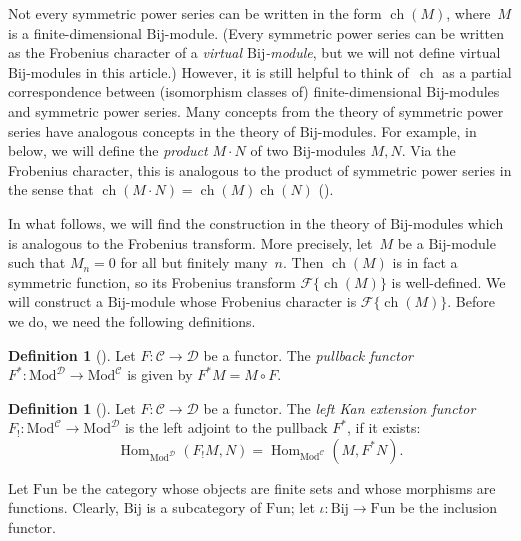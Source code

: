 \documentclass[11pt]{article}
\theoremstyle{definition}
\newtheorem{defi}[theo]{Definition}
\numberwithin{equation}{section}
\newcommand{\Mod}{\mathrm{Mod}}
\newcommand{\rmBij}{\mathrm{Bij}}
\newcommand{\rmFun}{\mathrm{Fun}}
\newcommand{\F}[1]{\mathscr{F}\{#1\}}
\DeclareMathOperator{\ch}{ch}
\DeclareMathOperator{\Hom}{Hom}
\begin{document}
Not every symmetric power series can be written in the form $\ch(M)$, where~$M$ is a finite-dimensional $\rmBij$-module. (Every symmetric power series can be written as the Frobenius character of a \emph{virtual $\rmBij$-module}, but we will not define virtual $\rmBij$-modules in this article.) However, it is still helpful to think of~$\ch$ as a partial correspondence between (isomorphism classes of) finite-dimensional $\rmBij$-modules and symmetric power series. Many concepts from the theory of symmetric power series have analogous concepts in the theory of $\rmBij$-modules. For example, in  below, we will define the \emph{product} $M \cdot N$ of two $\rmBij$-modules $M, N$. Via the Frobenius character, this is analogous to the product of symmetric power series in the sense that $\ch(M \cdot N) = \ch(M) \ch(N)$ ().

In what follows, we will find the construction in the theory of $\rmBij$-modules which is analogous to the Frobenius transform. More precisely, let~$M$ be a $\rmBij$-module such that $M_n = 0$ for all but finitely many~$n$. Then $\ch(M)$ is in fact a symmetric function, so its Frobenius transform $\F{\ch(M)}$ is well-defined. We will construct a $\rmBij$-module whose Frobenius character is $\F{\ch(M)}$. Before we do, we need the following definitions.

\begin{defi}[{\cite[Definition~2.6.1]{MR3641124}}]
    Let $F \colon \mathcal{C} \to \mathcal{D}$ be a functor. The \emph{pullback functor} $F^* \colon \Mod^\mathcal{D} \to \Mod^\mathcal{C}$ is given by $F^*M = M \circ F$.
\end{defi}
\begin{defi}[{\cite[Proposition~2.6.2]{MR3641124}}]
    Let $F \colon \mathcal{C} \to \mathcal{D}$ be a functor. The \emph{left Kan extension functor} $F_! \colon \Mod^\mathcal{C} \to \Mod^\mathcal{D}$ is the left adjoint to the pullback $F^*$, if it exists:
    \[\Hom_{\Mod^\mathcal{D}}(F_! M, N) = \Hom_{\Mod^\mathcal{C}}(M, F^*N).\]
\end{defi}

Let $\rmFun$ be the category whose objects are finite sets and whose morphisms are functions. Clearly, $\rmBij$ is a subcategory of $\rmFun$; let $\iota \colon \rmBij \to \rmFun$ be the inclusion functor.
\end{document}
